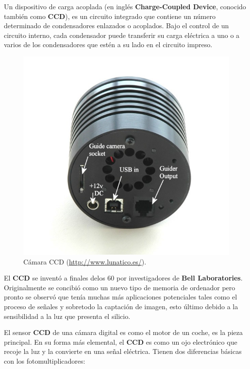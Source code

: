 Un dispositivo de carga acoplada (en inglés \textbf{Charge-Coupled Device}, conocido también como \textbf{CCD}), es un circuito integrado que contiene un número determinado de condensadores enlazados o acoplados. Bajo el control de un circuito interno, cada condensador puede transferir su carga eléctrica a uno o a varios de los condensadores que estén a su lado en el circuito impreso.

\bigskip
\begin{figure}[!ht]
  \begin{center}
  \includegraphics[width=1\textwidth]{../images/ccd.jpg}
  \caption{Cámara CCD (\url{http://www.lunatico.es/}).}
  \label{fig:diag_scrum}
  \end{center}
\end{figure}

\bigskip
El \textbf{CCD} se inventó a finales delos 60 por investigadores de \textbf{Bell Laboratories}. Originalmente se concibió como un nuevo tipo de memoria de ordenador pero pronto se observó que tenía muchas más aplicaciones potenciales tales como el proceso de señales y sobretodo la captación de imagen, esto último debido a la sensibilidad a la luz que presenta el silicio.

\bigskip
El sensor \textbf{CCD} de una cámara digital es como el motor de un coche, es la pieza principal. En su forma más elemental, el \textbf{CCD} es como un ojo electrónico que recoje la luz y la convierte en una señal eléctrica. Tienen dos diferencias básicas con los fotomultiplicadores:

